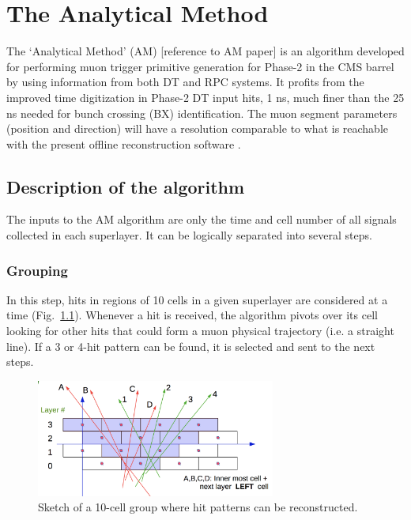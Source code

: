 \documentclass[../main.tex]{subfiles}
\begin{document}
\chapter{The Analytical Method}

The `Analytical Method' (AM) [reference to AM paper] is an algorithm developed for performing muon trigger primitive generation for Phase-2 in the CMS barrel by using information from both DT and RPC systems. It profits from the improved time digitization in Phase-2 DT input hits, 1 ns, much finer than the 25 ns needed for bunch crossing (BX) identification. The muon segment parameters (position and direction) will have a resolution comparable to what is reachable with the present offline reconstruction software \cite{dts:performance_offline}.

\section{Description of the algorithm}

The inputs to the AM algorithm are only the time and cell number of all signals collected in each superlayer. It can be logically separated into several steps.

\subsection{Grouping}

In this step, hits in regions of 10 cells in a given superlayer are considered at a time (Fig.~\ref{dts:fig:triangle}). Whenever a hit is received, the algorithm pivots over its cell looking for other hits that could form a muon physical trajectory (i.e. a straight line). If a 3 or 4-hit pattern can be found, it is selected and sent to the next steps.

\begin{figure}[h!]
\begin{center}
\includegraphics[width=0.7\textwidth]{Images/triangle.png}
\end{center}
\caption{Sketch of a 10-cell group where hit patterns can be reconstructed.}
\label{dts:fig:triangle}
\end{figure}
\end{document}
